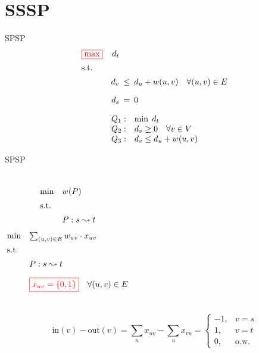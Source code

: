 \section{SSSP}

\begin{frame}{SPSP}
  \begin{equation*}
	\setlength\arraycolsep{2.5pt}
	\begin{array}{l@{\quad}rcl}
	  \color{red}{\boxed{\max}} 	& d_t	& &	\\[5pt]
	  \text{s.t.} 	& &	\\[5pt]
			& d_v   &\leq& d_u + w(u,v) \quad \forall (u,v) \in E	\\[10pt]
			& d_s	&=& 0 
	\end{array}
  \end{equation*}

  \vspace{0.60cm}

  \begin{equation*}
	\setlength\arraycolsep{2.5pt}
	\begin{array}{l@{\quad}l}
	  Q_{1}:	& \min \; d_t	\\
	  Q_{2}:	& d_v \geq 0 \quad \forall v \in V \\
	  Q_{3}:	& d_v \leq d_u + w(u,v)
	\end{array}
  \end{equation*}
\end{frame}
\begin{frame}{SPSP}
  \begin{columns}
	  \begin{equation*}
		\setlength\arraycolsep{2.5pt}
		\begin{array}{l@{\quad}l}
		  \min	& w(P)		\\[5pt]
		  \text{s.t.} 		\\[5pt]
		  & P: s \leadsto t
		\end{array}
	  \end{equation*}
	  \begin{equation*}
		\setlength\arraycolsep{2.5pt}
		\begin{array}{l@{\quad}l}
		  \min	& \sum_{(u,v) \in E} w_{uv} \cdot x_{uv}		\\[5pt]
		  \text{s.t.} 		\\[5pt]
		  & P: s \leadsto t	\\[10pt]
		  &	\red{\boxed{x_{uv} = \set{0,1}}}	\quad \forall (u,v) \in E
		\end{array}
	  \end{equation*}
  \end{columns}

  \vspace{0.80cm}

  \[
	 \text{in}(v) - \text{out}(v) 
	 =	\sum_{u} x_{uv} - \sum_{u} x_{vu} 
	 = \left\{\begin{array}{rl}
	  -1,	&	v = s	\\
	  1,	&	v = t	\\
	  0,	&	\text{o.w.}
	\end{array}\right.
  \]
\end{frame}
